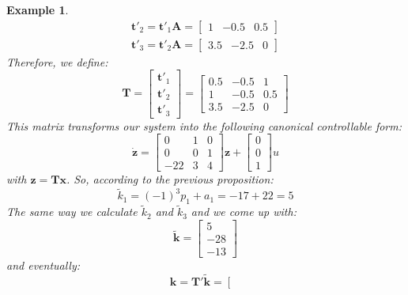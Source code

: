 \documentclass[a4paper,10pt,oneside]{book}
\newtheorem{example}{Example}
\begin{document}
\begin{example}
\begin{eqnarray}
\mathbf{t}'_2=\mathbf{t}'_1\mathbf{A}=\left[ {\begin{array}{ccc}1&-0.5&0.5\end{array} } \right]\\
 \mathbf{t}'_3=\mathbf{t}'_2\mathbf{A}=\left[ {\begin{array}{ccc}3.5&-2.5&0\end{array} } \right]
\end{eqnarray}
Therefore, we define:
\begin{equation}
 \mathbf{T}=
\left[ {\begin{array}{c}
\mathbf{t}'_1\\\mathbf{t}'_2\\\mathbf{t}'_3
 \end{array} } \right]=
\left[ {\begin{array}{ccc}
0.5&-0.5&1\\
1&-0.5&0.5\\
3.5&-2.5&0
 \end{array} } \right]
\end{equation}
This matrix transforms our system into the following canonical controllable form:
\begin{equation}
 \dot{ \mathbf{z}}=\left[ {\begin{array}{ccc}
0 & 1 & 0\\
0& 0 & 1\\
-22& 3 & 4
 \end{array} } \right]\mathbf{z}+
\left[ {\begin{array}{c}
0\\
0\\
1
 \end{array} } \right]u
\end{equation}
with $\mathbf{z}=\mathbf{Tx}$. So, according to the previous proposition:
\begin{equation}
\tilde{k}_1=(-1)^3p_1+a_1=-17+22=5
\end{equation}
The same way we calculate $\tilde{k}_2$ and $\tilde{k}_3$ and we come up with:
\begin{equation}
\tilde{\mathbf{k}}=\left[ {\begin{array}{c}
5\\
-28\\
-13
 \end{array} } \right]
\end{equation}
and eventually:
\begin{equation}
\mathbf{k}=\mathbf{T}'\tilde{\mathbf{k}}=\left[ {\begin{array}{c}

\end{array}}
\end{equation}
\end{example}
\end{document}
